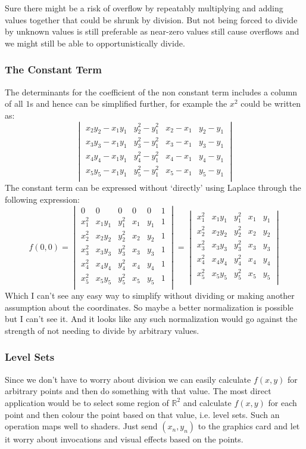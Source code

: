 Sure there might be a risk of overflow by repeatably multiplying and adding values together that could be shrunk by division.
But not being forced to divide by unknown values is still preferable as near-zero values still cause overflows and we might still be able to opportunistically divide.

\subsubsection{The Constant Term}
The determinants for the coefficient of the non constant term includes a column of all $1$s and hence can be simplified further,
for example the $x^2$ could be written as:
\[\begin{vmatrix}
	x_2y_2-x_1y_1&y_2^2-y_1^2&x_2-x_1&y_2-y_1\\
	x_3y_3-x_1y_1&y_3^2-y_1^2&x_3-x_1&y_3-y_1\\
	x_4y_4-x_1y_1&y_4^2-y_1^2&x_4-x_1&y_4-y_1\\
	x_5y_5-x_1y_1&y_5^2-y_1^2&x_5-x_1&y_5-y_1\\
\end{vmatrix}\]
The constant term can be expressed without `directly' using Laplace through the following expression:
\[
f(0,0) = \begin{vmatrix}
	0&0&0&0&0&1\\
	x_1^2&x_1y_1&y_1^2&x_1&y_1&1\\
	x_2^2&x_2y_2&y_2^2&x_2&y_2&1\\
	x_3^2&x_3y_3&y_3^2&x_3&y_3&1\\
	x_4^2&x_4y_4&y_4^2&x_4&y_4&1\\
	x_5^2&x_5y_5&y_5^2&x_5&y_5&1\\
	\end{vmatrix}
= \begin{vmatrix}
	x_1^2&x_1y_1&y_1^2&x_1&y_1\\
	x_2^2&x_2y_2&y_2^2&x_2&y_2\\
	x_3^2&x_3y_3&y_3^2&x_3&y_3\\
	x_4^2&x_4y_4&y_4^2&x_4&y_4\\
	x_5^2&x_5y_5&y_5^2&x_5&y_5\\
	\end{vmatrix}
\]
Which I can't see any easy way to simplify without dividing or making another assumption about the coordinates.
So maybe a better normalization is possible but I can't see it.
And it looks like any such normalization would go against the strength of not needing to divide by arbitrary values.

\subsubsection{Level Sets}
Since we don't have to worry about division we can easily calculate $f(x,y)$ for arbitrary points and then do something with that value.
The most direct application would be to select some region of $\mathbb{R}^2$ and calculate $f(x,y)$ for each point and then colour the point based on that value,
i.e. level sets.
Such an operation maps well to shaders.
Just send $(x_n,y_n)$ to the graphics card and let it worry about invocations and visual effects based on the points.
\\

